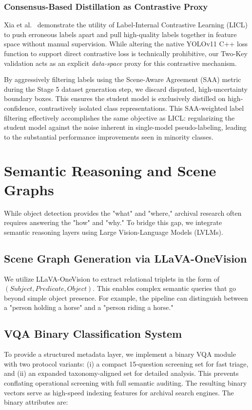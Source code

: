 \documentclass[12pt,onecolumn,a4paper]{IEEEtran}
\begin{document}
\subsubsection{Consensus-Based Distillation as Contrastive Proxy}
Xia et al.~\cite{xia2025dota} demonstrate the utility of Label-Internal Contrastive Learning (LICL) to push erroneous labels apart and pull high-quality labels together in feature space without manual supervision. While altering the native YOLOv11 C++ loss function to support direct contrastive loss is technically prohibitive, our Two-Key validation acts as an explicit \textit{data-space} proxy for this contrastive mechanism. 

By aggressively filtering labels using the Scene-Aware Agreement (SAA) metric during the Stage 5 dataset generation step, we discard disputed, high-uncertainty boundary boxes. This ensures the student model is exclusively distilled on high-confidence, contrastively isolated class representations. This SAA-weighted label filtering effectively accomplishes the same objective as LICL: regularizing the student model against the noise inherent in single-model pseudo-labeling, leading to the substantial performance improvements seen in minority classes.


\section{Semantic Reasoning and Scene Graphs}
While object detection provides the "what" and "where," archival research often requires answering the "how" and "why." To bridge this gap, we integrate semantic reasoning layers using Large Vision-Language Models (LVLMs).

\subsection{Scene Graph Generation via LLaVA-OneVision}
We utilize LLaVA-OneVision \cite{llava_onevision2024} to extract relational triplets in the form of $(Subject, Predicate, Object)$. This enables complex semantic queries that go beyond simple object presence. For example, the pipeline can distinguish between a "person holding a horse" and a "person riding a horse."

\subsection{VQA Binary Classification System}
To provide a structured metadata layer, we implement a binary VQA module with two protocol variants: (i) a compact 15-question screening set for fast triage, and (ii) an expanded taxonomy-aligned set for detailed analysis. This prevents conflating operational screening with full semantic auditing. The resulting binary vectors serve as high-speed indexing features for archival search engines. The binary attributes are:
\end{document}
